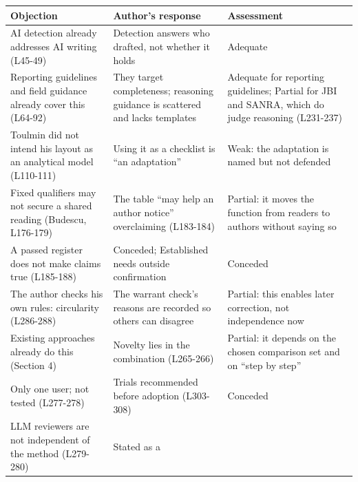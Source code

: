 {\begin{longtable}[]{@{}
  >{\raggedright\arraybackslash}p{}
  >{\raggedright\arraybackslash}p{}
  >{\raggedright\arraybackslash}p{}@{}}
\toprule\noalign{}
\begin{minipage}[b]{\linewidth}\raggedright
Objection
\end{minipage} & \begin{minipage}[b]{\linewidth}\raggedright
Author's response
\end{minipage} & \begin{minipage}[b]{\linewidth}\raggedright
Assessment
\end{minipage} \\
\midrule\noalign{}
\endhead
\bottomrule\noalign{}
\endlastfoot
AI detection already addresses AI writing (L45-49) & Detection answers
who drafted, not whether it holds & Adequate \\
Reporting guidelines and field guidance already cover this (L64-92) &
They target completeness; reasoning guidance is scattered and lacks
templates & Adequate for reporting guidelines; Partial for JBI and
SANRA, which do judge reasoning (L231-237) \\
Toulmin did not intend his layout as an analytical model (L110-111) &
Using it as a checklist is ``an adaptation'' & Weak: the adaptation is
named but not defended \\
Fixed qualifiers may not secure a shared reading (Budescu, L176-179) &
The table ``may help an author notice'' overclaiming (L183-184) &
Partial: it moves the function from readers to authors without saying
so \\
A passed register does not make claims true (L185-188) & Conceded;
Established needs outside confirmation & Conceded \\
The author checks his own rules: circularity (L286-288) & The warrant
check's reasons are recorded so others can disagree & Partial: this
enables later correction, not independence now \\
Existing approaches already do this (Section 4) & Novelty lies in the
combination (L265-266) & Partial: it depends on the chosen comparison
set and on ``step by step'' \\
Only one user; not tested (L277-278) & Trials recommended before
adoption (L303-308) & Conceded \\
LLM reviewers are not independent of the method (L279-280) & Stated as a

\end{longtable}}
